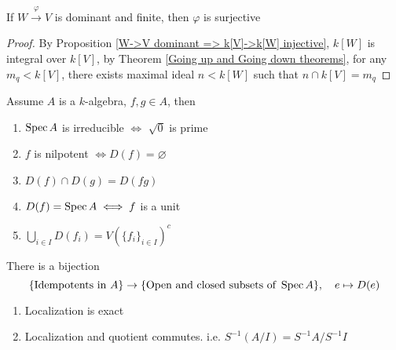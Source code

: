 \documentclass[main]{subfiles}
\begin{document}
\begin{proposition}
If $W\xrightarrow{\varphi}V$ is dominant and finite, then $\varphi$ is surjective
\end{proposition}

\begin{proof}
By Proposition \ref{W->V dominant => k[V]->k[W] injective}, $k[W]$ is integral over $k[V]$, by Theorem \ref{Going up and Going down theorems}, for any $m_q<k[V]$, there exists maximal ideal $n<k[W]$ such that $n\cap k[V]=m_q$
\end{proof}

\begin{proposition}
Assume $A$ is a $k$-algebra, $f,g\in A$, then
\begin{enumerate}
\item $\operatorname{Spec} A$ is irreducible $\iff$ $\sqrt{0}$ is prime
\item $f$ is nilpotent $\iff D(f)=\varnothing$
\item $D(f)\cap D(g)=D(fg)$
\item $D(f)=\operatorname{Spec} A\iff f$ is a unit
\item $\bigcup_{i\in I}D(f_i)=V(\{f_i\}_{i\in I})^c$
\end{enumerate}
\end{proposition}

\begin{lemma}\label{16:28-04/27/2022}
There is a bijection
\[
\{\text{Idempotents in }A\}\to\{\text{Open and closed subsets of }\operatorname{Spec} A\},\quad e\mapsto D(e)
\]
\end{lemma}

\begin{proposition}
\begin{enumerate}
\item Localization is exact
\item Localization and quotient commutes. i.e. $S^{-1}(A/I)=S^{-1}A/S^{-1}I$
\end{enumerate}
\end{proposition}
\end{document}
